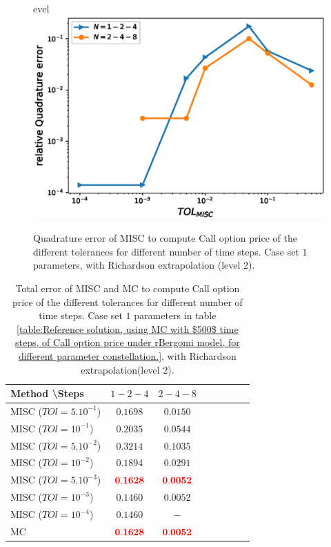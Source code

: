 \documentclass[11pt]{article}
\begin{document}
\begin{figure}[h!]
\centering
evel\includegraphics[width=0.7\linewidth]{./figures/rBergomi_MISC_quadratre_error/vs_TOL/set1/relative_quad_error_wrt_MISC_TOL_set1_rich_level2}


\caption{Quadrature error of MISC to compute Call option price of the different tolerances for different number of time steps. Case  set $1$ parameters, with Richardson extrapolation (level 2).}
\label{fig:Quadrature_error_set1_rich_level2}
\end{figure}




\begin{table}[!h]
\centering
\begin{tabular}{l*{6}{c}r}
Method \textbackslash  Steps            & $1-2-4$ & $2-4-8$  \\
\hline
MISC ($TOl=5.10^{-1}$)  & $\mathbf{0.1698
}$ & $\mathbf{ 0.0150}$  \\
MISC ($TOl=10^{-1}$)  & $\mathbf{0.2035
}$ & $\mathbf{ 0.0544}$ \\
MISC ($TOl=5.10^{-2}$)  & $\mathbf{0.3214
}$ & $\mathbf{    0.1035}$  \\
MISC ($TOl=10^{-2}$)  & $\mathbf{0.1894}$ & $\mathbf{  0.0291}$   \\	
MISC ($TOl=5.10^{-3}$)  & $\mathbf{{\color{red}0.1628}}$ & $\mathbf{{\color{red}0.0052}}$   \\
MISC ($TOl=10^{-3}$)  & $\mathbf{0.1460}$ & $\mathbf{0.0052}$   \\
MISC ($TOl=10^{-4}$)  & $\mathbf{0.1460}$ & $\mathbf{-}$  \\
\hline
MC   & $\mathbf{{\color{red}0.1628}}$  & $\mathbf{{\color{red}0.0052}}$    \\
\hline
\end{tabular}
\caption{Total  error of MISC and MC to compute Call option price of the different tolerances for different number of time steps. Case set $1$ parameters in table \ref{table:Reference solution, using MC with $500$ time steps, of Call option price under rBergomi model, for different parameter constellation.}, with Richardson extrapolation(level $2$).}
\label{Total  error of MISC and MC to compute Call option price of the different tolerances for different number of time steps. Case set $1$ parameters, with Richardson extrapolation(level $2$). The numbers between parentheses are the corresponding absolute errors.}
\end{table}
\end{document}
